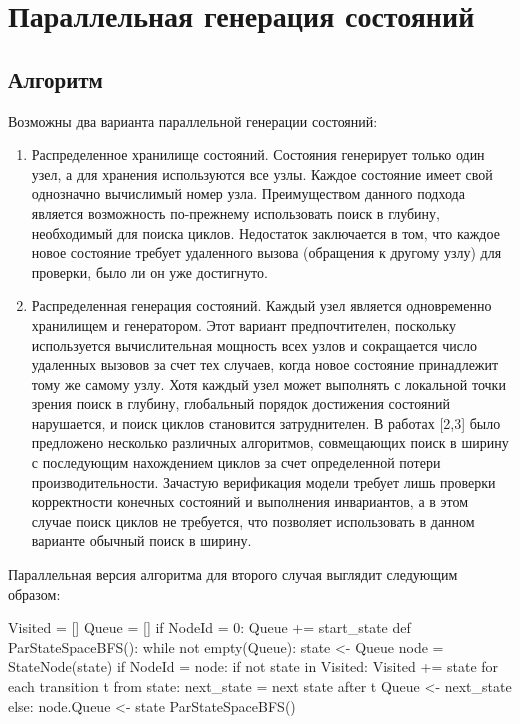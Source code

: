 \chapter{Параллельная генерация состояний}
\label{sec:par-statespace}

\section{Алгоритм}
\label{sec:par-algo}

Возможны два варианта параллельной генерации состояний:

\begin{enumerate}
\item Распределенное хранилище состояний. Состояния генерирует только
  один узел, а для хранения используются все узлы. Каждое состояние
  имеет свой однозначно вычислимый номер узла. Преимуществом данного
  подхода является возможность по-прежнему использовать поиск в
  глубину, необходимый для поиска циклов. Недостаток заключается в
  том, что каждое новое состояние требует удаленного вызова (обращения
  к другому узлу) для проверки, было ли он уже достигнуто.

\item Распределенная генерация состояний. Каждый узел является
  одновременно хранилищем и генератором. Этот вариант предпочтителен,
  поскольку используется вычислительная мощность всех узлов и
  сокращается число удаленных вызовов за счет тех случаев, когда новое
  состояние принадлежит тому же самому узлу. Хотя каждый узел может
  выполнять с локальной точки зрения поиск в глубину, глобальный
  порядок достижения состояний нарушается, и поиск циклов становится
  затруднителен. В работах [2,3] было предложено несколько различных
  алгоритмов, совмещающих поиск в ширину с последующим нахождением
  циклов за счет определенной потери производительности. Зачастую
  верификация модели требует лишь проверки корректности конечных
  состояний и выполнения инвариантов, а в этом случае поиск циклов не
  требуется, что позволяет использовать в данном варианте обычный
  поиск в ширину.
\end{enumerate}

Параллельная версия алгоритма для второго случая выглядит следующим
образом:

\begin{CodeBlock}
Visited = []
Queue = []
if NodeId = 0:
    Queue += start_state
def ParStateSpaceBFS():
    while not empty(Queue):
        state <- Queue
        node = StateNode(state)
        if NodeId = node:
            if not state in Visited:
                Visited += state
                for each transition t from state:
                    next_state = next state after t
                    Queue <- next_state
        else:
            node.Queue <- state
ParStateSpaceBFS()
\end{CodeBlock}


